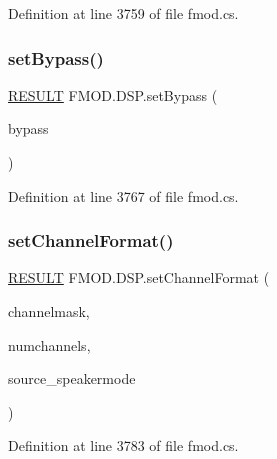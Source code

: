 Definition at line 3759 of file fmod.\+cs.

\mbox{\label{class_f_m_o_d_1_1_d_s_p_a4168480afea4775637ed9443046de78f}} 
\subsubsection{\texorpdfstring{set\+Bypass()}{setBypass()}}
{\footnotesize\ttfamily \hyperlink{namespace_f_m_o_d_a305d1176ef3f8c8815861a60407ac33d}{R\+E\+S\+U\+LT} F\+M\+O\+D.\+D\+S\+P.\+set\+Bypass (\begin{DoxyParamCaption}\item[{bool}]{bypass }\end{DoxyParamCaption})}



Definition at line 3767 of file fmod.\+cs.

\mbox{\label{class_f_m_o_d_1_1_d_s_p_a9e209a66e01c2373bc7d93e0a61a3afa}} 
\subsubsection{\texorpdfstring{set\+Channel\+Format()}{setChannelFormat()}}
{\footnotesize\ttfamily \hyperlink{namespace_f_m_o_d_a305d1176ef3f8c8815861a60407ac33d}{R\+E\+S\+U\+LT} F\+M\+O\+D.\+D\+S\+P.\+set\+Channel\+Format (\begin{DoxyParamCaption}\item[{\hyperlink{namespace_f_m_o_d_ae295945ff00acb5f2e5ef0b3f217f5e2}{C\+H\+A\+N\+N\+E\+L\+M\+A\+SK}}]{channelmask,  }\item[{int}]{numchannels,  }\item[{\hyperlink{namespace_f_m_o_d_aa0732e7e8efd3b96b526a7f2f8479634}{S\+P\+E\+A\+K\+E\+R\+M\+O\+DE}}]{source\+\_\+speakermode }\end{DoxyParamCaption})}



Definition at line 3783 of file fmod.\+cs.

\mbox{\label{class_f_m_o_d_1_1_d_s_p_ab6bb9f4fa104f2ec9ad8c865901cb58f}} 
